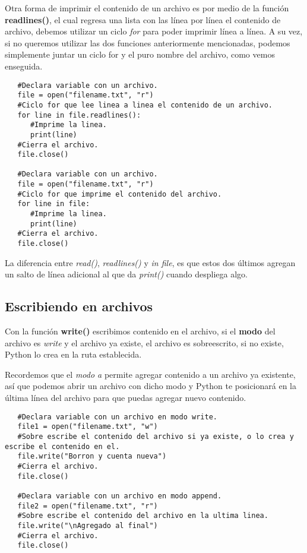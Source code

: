 Otra forma de imprimir el contenido de un archivo es por medio de la función \textbf{readlines()}, el cual regresa una lista con las línea por línea el contenido de archivo, debemos utilizar un ciclo \textit{for} para poder imprimir línea a línea. A su vez, si no queremos utilizar las dos funciones anteriormente mencionadas, podemos simplemente juntar un ciclo for y el puro nombre del archivo, como vemos enseguida.
\begin{lstlisting}
   #Declara variable con un archivo.
   file = open("filename.txt", "r")
   #Ciclo for que lee linea a linea el contenido de un archivo.
   for line in file.readlines():
      #Imprime la linea.
      print(line)
   #Cierra el archivo.
   file.close()
   
   #Declara variable con un archivo.
   file = open("filename.txt", "r")
   #Ciclo for que imprime el contenido del archivo.
   for line in file:
      #Imprime la linea.
      print(line)
   #Cierra el archivo.
   file.close()
\end{lstlisting}

La diferencia entre \textit{read()}, \textit{readlines()} y \textit{in file}, es que estos dos últimos agregan un salto de línea adicional al que da \textit{print()} cuando despliega algo.


\subsection{Escribiendo en archivos}
\hspace{0.55cm}Con la función \textbf{write()} escribimos contenido en el archivo, si el \textbf{modo} del archivo es \textit{write} y el archivo ya existe, el archivo es sobreescrito, si no existe, Python lo crea en la ruta establecida.

Recordemos que el \textit{modo a} permite agregar contenido a un archivo ya existente, así que podemos abrir un archivo con dicho modo y Python te posicionará en la última línea del archivo para que puedas agregar nuevo contenido.
\begin{lstlisting}
   #Declara variable con un archivo en modo write.
   file1 = open("filename.txt", "w")
   #Sobre escribe el contenido del archivo si ya existe, o lo crea y escribe el contenido en el.
   file.write("Borron y cuenta nueva")
   #Cierra el archivo.
   file.close()
   
   #Declara variable con un archivo en modo append.
   file2 = open("filename.txt", "r")
   #Sobre escribe el contenido del archivo en la ultima linea.
   file.write("\nAgregado al final")
   #Cierra el archivo.
   file.close()
\end{lstlisting}

